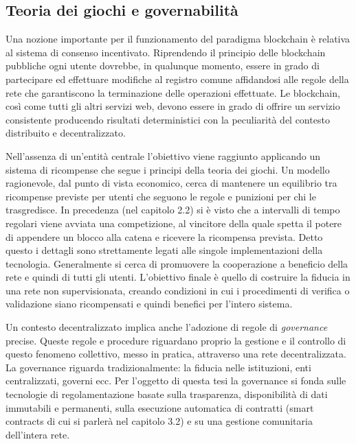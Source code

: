 \subsection{Teoria dei giochi e governabilità}

Una nozione importante per il funzionamento del paradigma blockchain è relativa al sistema di consenso incentivato. Riprendendo il principio delle blockchain pubbliche ogni utente dovrebbe, in qualunque momento, essere in grado di partecipare ed effettuare modifiche al registro comune affidandosi alle regole della rete che garantiscono la terminazione delle operazioni effettuate. Le blockchain, così come tutti gli altri servizi web, devono essere in grado di offrire un servizio consistente producendo risultati deterministici con la peculiarità del contesto distribuito e decentralizzato.

Nell’assenza di un’entità centrale l’obiettivo viene raggiunto applicando un sistema di ricompense che segue i principi della teoria dei giochi. Un modello ragionevole, dal punto di vista economico, cerca di mantenere un equilibrio tra ricompense previste per utenti che seguono le regole e punizioni per chi le trasgredisce. In precedenza (nel capitolo 2.2) si è visto che a intervalli di tempo regolari viene avviata una competizione, al vincitore della quale spetta il potere di appendere un blocco alla catena e ricevere la ricompensa prevista. Detto questo i dettagli sono strettamente legati alle singole implementazioni della tecnologia. Generalmente si cerca di promuovere la cooperazione a beneficio della rete e quindi di tutti gli utenti. L'obiettivo finale è quello di costruire la fiducia in una rete non supervisionata, creando condizioni in cui i procedimenti di verifica o validazione siano ricompensati e quindi benefici per l’intero sistema.

Un contesto decentralizzato implica anche l’adozione di regole di \emph{governance} precise. Queste regole e procedure riguardano proprio la gestione e il controllo di questo fenomeno collettivo, messo in pratica, attraverso una rete decentralizzata. La governance riguarda tradizionalmente: la fiducia nelle istituzioni, enti centralizzati, governi ecc. Per l’oggetto di questa tesi la governance si fonda sulle tecnologie di regolamentazione basate sulla trasparenza, disponibilità di dati immutabili e permanenti, sulla esecuzione automatica di contratti (smart contracts di cui si parlerà nel capitolo 3.2) e su una gestione comunitaria dell’intera rete.

